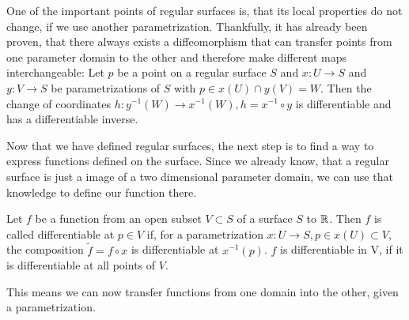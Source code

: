 One of the important points of regular surfaces is, that its local properties do not change, if we use another parametrization.
Thankfully, it has already been proven, that there always exists a diffeomorphism that can transfer points from one parameter domain to the other and therefore make different maps interchangeable:
Let $p$ be a point on a regular surface $S$ and $x: U \rightarrow S$ and $y: V \rightarrow S$ be parametrizations of $S$ with $p \in x(U) \cap y(V) = W$.
Then the change of coordinates $h: y^{-1}(W) \rightarrow x^{-1}(W), h = x^{-1} \circ y$ is differentiable and has a differentiable inverse.

Now that we have defined regular surfaces, the next step is to find a way to express functions defined on the surface.
Since we already know, that a regular surface is just a image of a two dimensional parameter domain, we can use that knowledge to define our function there.
\begin{mydef}
	Let $f$ be a function from an open subset $V \subset S$ of a surface $S$ to $\mathbb{R}$.
	Then $f$ is called differentiable at $p \in V$ if, for a parametrization $x: U \rightarrow S, p \in x(U) \subset V$, the composition $\tilde{f} = f \circ x$ is differentiable at $x^{-1}(p)$.
	$f$ is differentiable in V, if it is differentiable at all points of $V$.
\end{mydef}
This means we can now transfer functions from one domain into the other, given a parametrization.


